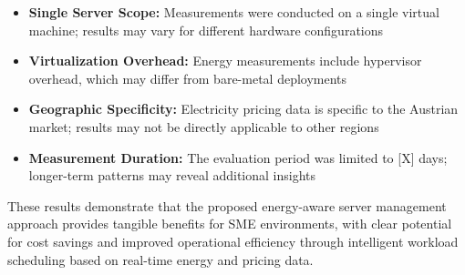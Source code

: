 \begin{itemize}
    \item \textbf{Single Server Scope:} Measurements were conducted on a single virtual 
    machine; results may vary for different hardware configurations
    \item \textbf{Virtualization Overhead:} Energy measurements include hypervisor 
    overhead, which may differ from bare-metal deployments
    \item \textbf{Geographic Specificity:} Electricity pricing data is specific to the 
    Austrian market; results may not be directly applicable to other regions
    \item \textbf{Measurement Duration:} The evaluation period was limited to [X] days; 
    longer-term patterns may reveal additional insights
\end{itemize}

These results demonstrate that the proposed energy-aware server management approach 
provides tangible benefits for SME environments, with clear potential for cost savings 
and improved operational efficiency through intelligent workload scheduling based on 
real-time energy and pricing data. 